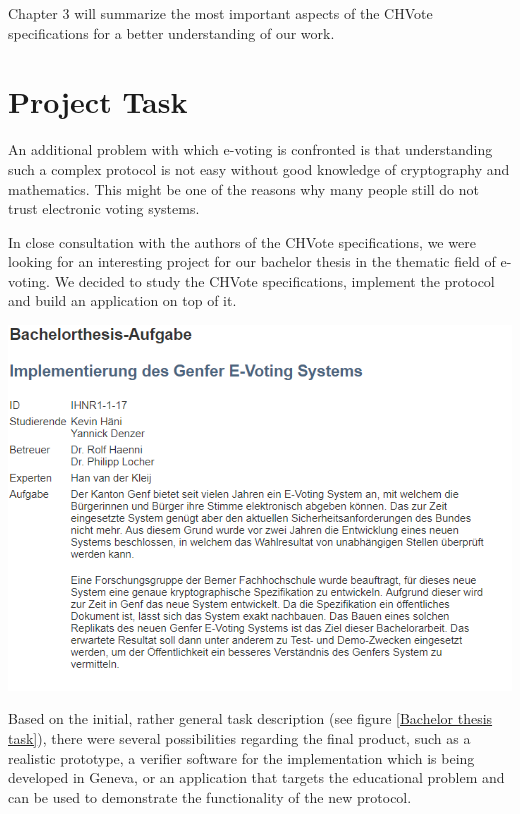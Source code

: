 Chapter 3 will summarize the most important aspects of the CHVote specifications for a better understanding of our work.

\section{Project Task}
An additional problem with which e-voting is confronted is that understanding such a complex protocol is not easy without good knowledge of cryptography and mathematics. This might be one of the reasons why many people still do not trust electronic voting systems.

In close consultation with the authors of the CHVote specifications, we were looking for an interesting project for our bachelor thesis in the thematic field of e-voting. We decided to study the CHVote specifications, implement the protocol and build an application on top of it.

\begin{center}
\includegraphics[scale=0.95]{assets/aufgabe.png}
\label{Bachelor thesis task}%
\end{center}

Based on the initial, rather general task description (see figure \ref{Bachelor thesis task}), there were several possibilities regarding the final product, such as a realistic prototype, a verifier software for the implementation which is being developed in Geneva, or an application that targets the educational problem and can be used to demonstrate the functionality of the new protocol.

